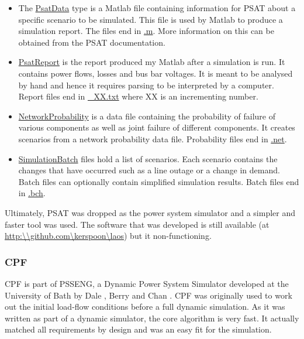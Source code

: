 \documentclass[a4paper,oneside,12pt]{report}
\begin{document}
\begin{itemize}

\item The \underline{PsatData} type is a Matlab file containing information for PSAT about a specific scenario to be simulated. This file is used by Matlab to produce a simulation report. The files end in \underline{.m}. More information on this can be obtained from the PSAT documentation.

\item \underline{PsatReport} is the report produced my Matlab after a simulation is run. It contains power flows, losses and bus bar voltages. It is meant to be analysed by hand and hence it requires parsing to be interpreted by a computer. Report files end in \underline{\_XX.txt} where XX is an incrementing number.

 \item \underline{NetworkProbability} is a data file containing the probability of failure of various components as well as joint failure of different components. It creates scenarios from a network probability data file. Probability files end in \underline{.net}.

\item \underline{SimulationBatch} files hold a list of scenarios. Each scenario contains the changes that have occurred such as a line outage or a change in demand. Batch files can optionally contain simplified simulation results. Batch files end in \underline{.bch}.
\end{itemize}

Ultimately, PSAT was dropped as the power system simulator and a simpler and faster tool was used. The software that was developed is still available (at \url{http:\\github.com\kerspoon\laos}) but it non-functioning.

\subsubsection{CPF}

CPF is part of PSSENG, a Dynamic Power System Simulator developed at the University of Bath by 
Dale \cite{Dale1986}, Berry \cite{Berry1989} and Chan \cite{Chan1992}. CPF was originally used to work out the initial load-flow conditions before a full dynamic simulation. As it was written as part of a dynamic simulator, the core algorithm is very fast. It actually matched all requirements by design and was an easy fit for the simulation. 
\end{document}

